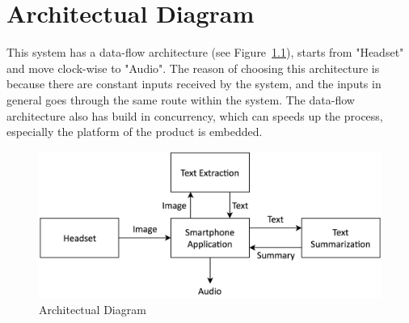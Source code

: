 \chapter{Architectual Diagram}
This system has a data-flow architecture (see Figure~\ref{fig:architectualDiagram}), starts from "Headset" and move clock-wise to "Audio". The reason of choosing this architecture is because there are constant inputs received by the system, and the inputs in general goes through the same route within the system. The data-flow architecture also has build in concurrency, which can speeds up the process, especially the platform of the product is embedded.
\begin{figure}
	\label{fig:architectualDiagram}
	\centering
    \includegraphics[scale = 0.2]{ArchitectureDiagram.png}
    
    \caption{Architectual Diagram}
\end{figure}